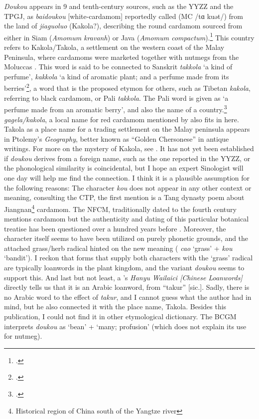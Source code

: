\textit{Doukou} appears in 9 and tenth-century sources, such as the \gls{YYZZ} and the \gls{TPGJ}, as  \textit{baidoukou} [white-cardamom] reportedly called  (\gls{MC} /tɑ kuət/) from the land of  \textit{jiaguoluo} (Kakola?), describing the round cardamom sourced from either in Siam (\textit{Amomum kravanh}) or Java (\textit{Amomum compactum}).\footcite[18:55]{yyzz} This country refers to Kakola/Takola, a settlement on the western coast of the Malay Peninsula, where cardamoms were marketed together with nutmegs from the Moluccas \autocite[22]{donkin_between_2003}. This word is said to be connected to Sanskrit  \textit{takkola} `a kind of perfume',  \textit{kakkola} `a kind of aromatic plant; and a perfume made from its berries'\footcite[431,241]{monier-williams_sanskrit-english_1899}, a word that is the proposed etymon for others, such as Tibetan  
\textit{kakola}, referring to black cardamom, or Pali \textit{takkola}. The Pali word is given as `a perfume made from an aromatic berry', and also the name of a country.\footcites[292]{pali_text_society_pali_1921}[59]{trenckner_pali_1879}  \textit{gagela/kakola}, a local name for red cardamom mentioned by \textcite{hu_food_2005} also fits in here. Takola as a place name for a trading settlement on the Malay peninsula appears in Ptolemy's \textit{Geography}, better known as ``Golden Chersonese'' in antique writings. For more on the mystery of Kakola, see \textcite{wheatley_golden_1961}. It has not yet been established if \textit{doukou} derives from a foreign name, such as the one reported in the \gls{YYZZ}, or the phonological similarity is coincidental, but I hope an expert Sinologist will one day will help me find the connection. I think it is a plausible assumption for the following reasons: The character  \textit{kou} does not appear in any other context or meaning, consulting the \gls{CTP}, the first mention is a Tang dynasty poem about Jiangnan\footnote{Historical region of China south of the Yangtze river} cardamom. The \gls{NFCM}, traditionally dated to the fourth century \BC{} mentions cardamom but the authenticity and dating of this particular botanical treatise has been questioned over a hundred years before \autocite{ma_authenticity_1978}. Moreover, the character itself seems to have been utilized on purely phonetic grounds, and the attached grass/herb radical hinted on the new meaning ( \textit{cao} `grass' +  \textit{kou} `bandit'). I reckon that forms that supply both characters with the `grass' radical are typically loanwords in the plant kingdom, and the variant  \textit{doukou} seems to support this. And last but not least, a \textcite[40]{shi_hanyu_2000}'s \textit{Hanyu Wailaici [Chinese Loanwords]} directly tells us that it is an Arabic loanword, from ``takur'' [sic.]. Sadly, there is no Arabic word to the effect of \textit{takur}, and I cannot guess what the author had in mind, but he also connected it with the place name, Takola. Besides this publication, I could not find it in other etymological dictionary. The \gls{BCGM} interprets \textit{doukou} as `bean' + `many; profusion' (which does not explain its use for nutmeg).

